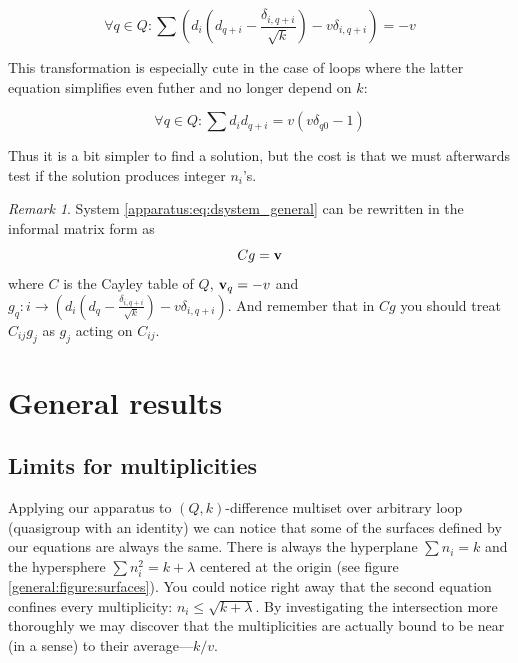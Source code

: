 \documentclass{article}
\theoremstyle{plain}
\theoremstyle{definition}
\theoremstyle{remark}
\newtheorem{remark}[theorem]{Remark}
\begin{document}
		\begin{equation}
			\label{apparatus:eq:dsystem_general}
			\forall q \in Q \colon \sum (d_i (d_{q+i}-\frac{\delta_{i,q+i}}{\sqrt k})-v\delta_{i,q+i}) = -v
		\end{equation}
		
		This transformation is especially cute in the case of loops where the latter equation simplifies even futher and no longer depend on $k$:
		
		\begin{equation}
			\label{apparatus:eq:dsystem}
			\forall q \in Q \colon \sum d_i d_{q+i} = v (v \delta_{q0}-1)
		\end{equation}
		
		Thus it is a bit simpler to find a solution, but the cost is that we must afterwards test if the solution produces integer $n_i$'s.
		
		\begin{remark}
            System \eqref{apparatus:eq:dsystem_general} can be rewritten in the informal matrix form as
            \begin{equation}
                \label{apparatus:eq:dmatrixform}
                Cg=\bf v
            \end{equation}
            where $C$ is the Cayley table of $Q$, ${\bf v}_q = -v$ and $g_q: i \rightarrow (d_i (d_q - \frac{\delta_{i,q+i}}{\sqrt k}) -v\delta_{i,q+i})$. And remember that in $Cg$ you should treat $C_{ij}g_j$ as $g_j$ acting on $C_{ij}$.
		\end{remark}
		
    \section{General results}
        \subsection{Limits for multiplicities}
            Applying our apparatus to $(Q,k)$-difference multiset over arbitrary loop (quasigroup with an identity) we can notice that some of the surfaces defined by our equations are always the same. There is always the hyperplane $\sum {n_i} = k$ and the hypersphere $\sum n_i^2 = k + \lambda$ centered at the origin (see figure \ref{general:figure:surfaces}). You could notice right away that the second equation confines every multiplicity: $n_i \leq \sqrt{k+\lambda}$. By investigating the intersection more thoroughly we may discover that the multiplicities are actually bound to be near (in a sense) to their average---$k/v$.
\end{document}
